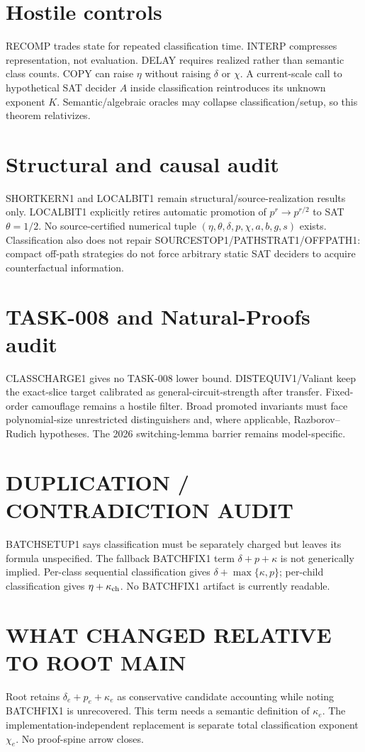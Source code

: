\documentclass[11pt]{article}
\begin{document}
\section*{Hostile controls}
RECOMP trades state for repeated classification time. INTERP compresses representation, not evaluation. DELAY requires realized rather than semantic class counts. COPY can raise $\eta$ without raising $\delta$ or $\chi$. A current-scale call to hypothetical SAT decider $A$ inside classification reintroduces its unknown exponent $K$. Semantic/algebraic oracles may collapse classification/setup, so this theorem relativizes.
\section*{Structural and causal audit}
SHORTKERN1 and LOCALBIT1 remain structural/source-realization results only. LOCALBIT1 explicitly retires automatic promotion of $p^r\to p^{r/2}$ to SAT $\theta=1/2$. No source-certified numerical tuple $(\eta,\theta,\delta,p,\chi,a,b,g,s)$ exists. Classification also does not repair SOURCESTOP1/PATHSTRAT1/OFFPATH1: compact off-path strategies do not force arbitrary static SAT deciders to acquire counterfactual information.
\section*{TASK-008 and Natural-Proofs audit}
CLASSCHARGE1 gives no TASK-008 lower bound. DISTEQUIV1/Valiant keep the exact-slice target calibrated as general-circuit-strength after transfer. Fixed-order camouflage remains a hostile filter. Broad promoted invariants must face polynomial-size unrestricted distinguishers and, where applicable, Razborov--Rudich hypotheses. The 2026 switching-lemma barrier remains model-specific.
\section*{DUPLICATION / CONTRADICTION AUDIT}
BATCHSETUP1 says classification must be separately charged but leaves its formula unspecified. The fallback BATCHFIX1 term $\delta+p+\kappa$ is not generically implied. Per-class sequential classification gives $\delta+\max\{\kappa,p\}$; per-child classification gives $\eta+\kappa_{\rm ch}$. No BATCHFIX1 artifact is currently readable.
\section*{WHAT CHANGED RELATIVE TO ROOT MAIN}
Root retains $\delta_e+p_e+\kappa_e$ as conservative candidate accounting while noting BATCHFIX1 is unrecovered. This term needs a semantic definition of $\kappa_e$. The implementation-independent replacement is separate total classification exponent $\chi_e$. No proof-spine arrow closes.
\end{document}
